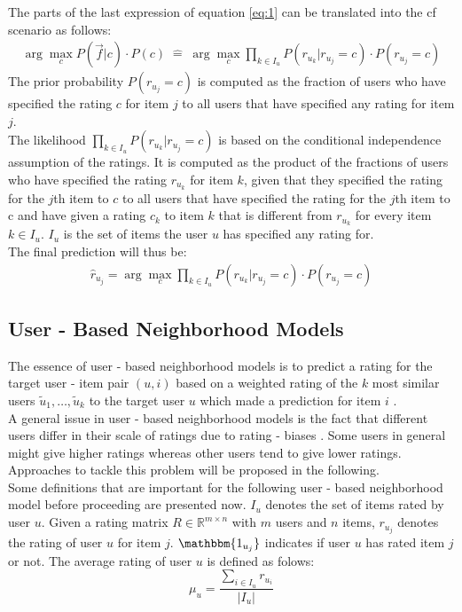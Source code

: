 The parts of the last expression of equation \eqref{eq:1} can be translated into the \acrshort{cf} scenario as follows:
\begin{equation}
    \begin{align*}
        \arg\max_{c} P(\Vec{f}|c)\cdot P(c) \;\widehat{=}\; \arg\max_{c} \prod\limits_{k \in I_u} P(r_{u_k}|r_{u_j}=c) \cdot P(r_{u_j} = c)
    \end{align*}
\end{equation}
The prior probability $P(r_{u_j} = c)$ is computed as the fraction of users who have specified the rating $c$ for item $j$ to all users that have specified any rating for item $j$.\\
The likelihood $\prod\limits_{k \in I_u} P(r_{u_k}|r_{u_j}=c)$ is based on the conditional independence assumption of the ratings.%
It is computed as the product of the fractions of users who have specified the rating $r_u_k$ for item $k$, given that they specified the rating for the $j$th item to $c$ to all users that have specified the rating for the $j$th item to c and have given a rating $c_k$ to item $k$ that is different from $r_{u_k}$ for every item $k \in I_u$. $I_u$ is the set of items the user $u$ has specified any rating for.\\
The final prediction will thus be:
\begin{equation}
    \begin{align*}
        \hat{r}_{u_j} = \arg\max_{c} \prod\limits_{k \in I_u} P(r_{u_k}|r_{u_j}=c) \cdot P(r_{u_j} = c)
    \end{align*}
\end{equation}

\subsection{User - Based Neighborhood Models}
The essence of user - based neighborhood models is to predict a rating for the target user - item pair $(u,i)$ based on a weighted rating of the $k$ most similar users $\tilde{u}_1, \dots ,\tilde{u}_k$ to the target user $u$ which made a prediction for item $i$ \cite{aggarwal2016recommender}. \\ 
A general issue in user - based neighborhood models is the fact that different users differ in their scale of ratings due to rating - biases \cite{wherry1982control}. Some users in general might give higher ratings whereas other users tend to give lower ratings. Approaches to tackle this problem will be proposed in the following.\\
Some definitions that are important for the following user - based neighborhood model before proceeding are presented now.
$I_u$ denotes the set of items rated by user $u$. Given a rating matrix $R \in \mathbb{R}^{m \times n}$ with $m$ users and $n$ items, $r_u_j$ denotes the rating of user $u$ for item $j$. $\mathbbm{1_{u_j}}$ indicates if user $u$ has rated item $j$ or not. The average rating of user $u$ is defined as folows:
    \begin{equation}
    \mu_u = \frac{\sum\limits_{i \in I_u}r_u_i}{|I_u|}
    \end{equation}

